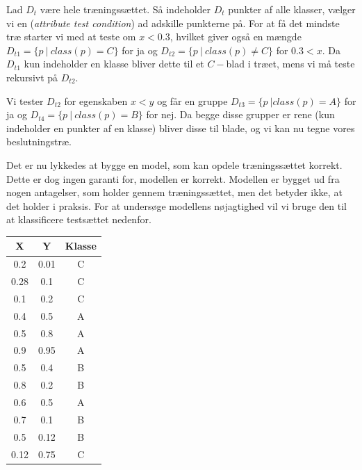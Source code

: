 \documentclass{article}
\begin{document}
Lad $D_t$ være hele træningssættet. Så indeholder $D_t$ punkter af alle klasser, vælger vi en (\textit{attribute test condition}) ad adskille punkterne på. For at få det mindste træ starter vi med at teste om $x<0.3$, hvilket giver også en mængde $D_{t1}=\{p\ |\ class(p)=C\}$ for ja og $D_{t2}=\{p\ |\ class(p)\neq C\}$ for $0.3<x$. Da $D_{t1}$ kun indeholder en klasse bliver dette til et $C-$blad i træet, mens vi må teste rekursivt på $D_{t2}$.

Vi tester $D_{t2}$ for egenskaben $x<y$ og får en gruppe $D_{t3}=\{p\ | class(p)=A\}$ for ja og $D_{t4}=\{p\ |\ class(p)=B\}$ for nej. Da begge disse grupper er rene (kun indeholder en punkter af en klasse) bliver disse til blade, og vi kan nu tegne vores beslutningstræ.

\begin{center}
\end{center}
Det er nu lykkedes at bygge en model, som kan opdele træningssættet korrekt. Dette er dog ingen garanti for, modellen er korrekt. Modellen er bygget ud fra nogen antagelser, som holder gennem træningssættet, men det betyder ikke, at det holder i praksis. For at undersøge modellens nøjagtighed vil vi bruge den til at klassificere testsættet nedenfor.

\begin{tabular}{c|c|c}
	X & Y & Klasse\\
	\hline
	0.2 & 0.01 & C\\
	0.28 & 0.1 & C\\
	0.1 & 0.2 & C\\
	0.4 & 0.5 & A\\
	0.5 & 0.8 & A\\
	0.9 & 0.95 & A\\
	0.5 & 0.4 & B\\
	0.8 & 0.2 & B\\
	0.6 & 0.5 & A\\
	0.7 & 0.1 & B\\
	0.5 & 0.12 & B\\
	0.12 & 0.75 & C
\end{tabular} 
\end{document}
